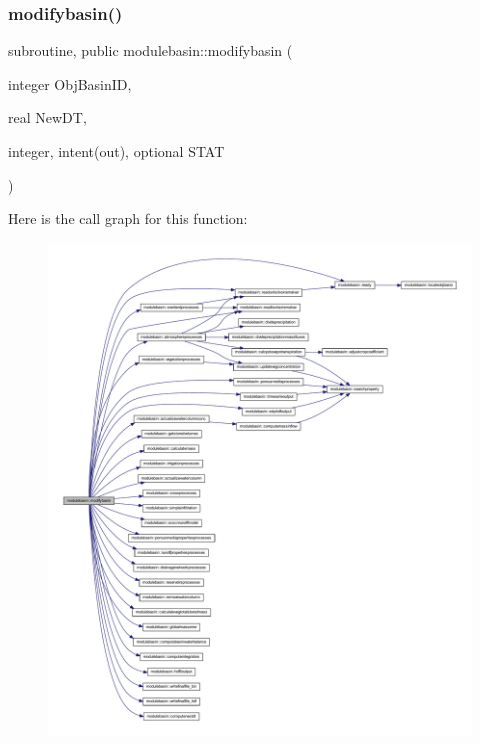 \subsubsection{\texorpdfstring{modifybasin()}{modifybasin()}}
{\footnotesize\ttfamily subroutine, public modulebasin\+::modifybasin (\begin{DoxyParamCaption}\item[{integer}]{Obj\+Basin\+ID,  }\item[{real}]{New\+DT,  }\item[{integer, intent(out), optional}]{S\+T\+AT }\end{DoxyParamCaption})}

Here is the call graph for this function\+:\nopagebreak
\begin{figure}[H]
\begin{center}
\leavevmode
\includegraphics[width=350pt]{namespacemodulebasin_a5ce7ee123ed0331d3bcb0ba4db4a9797_cgraph}
\end{center}
\end{figure}
\mbox{\label{namespacemodulebasin_a4732062e95bfb4656920c8c89a412510}} 
